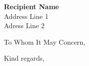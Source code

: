 \documentclass[10pt]{letter}
\begin{document}
\begin{letter} {{\bf Recipient Name} \\ {Address Line 1} \\ {Adress Line 2}}

\opening{To Whom It May Concern,}

\lipsum[1-2]

\closing{Kind regards,}

\end{letter}
\end{document}
